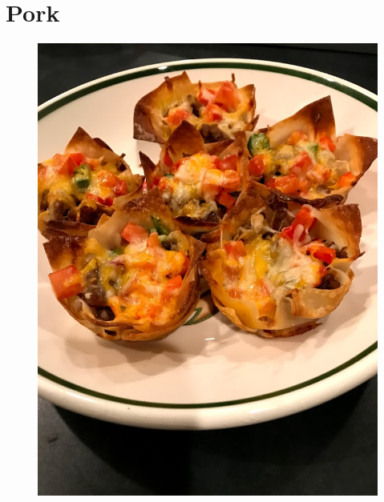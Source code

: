 \documentclass[11pt]{report}
\begin{document}
\chapter{Pork}
\begin{figure}[h]
\begin{center}
   \includegraphics[width=0.65\linewidth]{images/IMG_2918.jpg}
\end{center}
\end{figure}
\newpage










\end{document}
